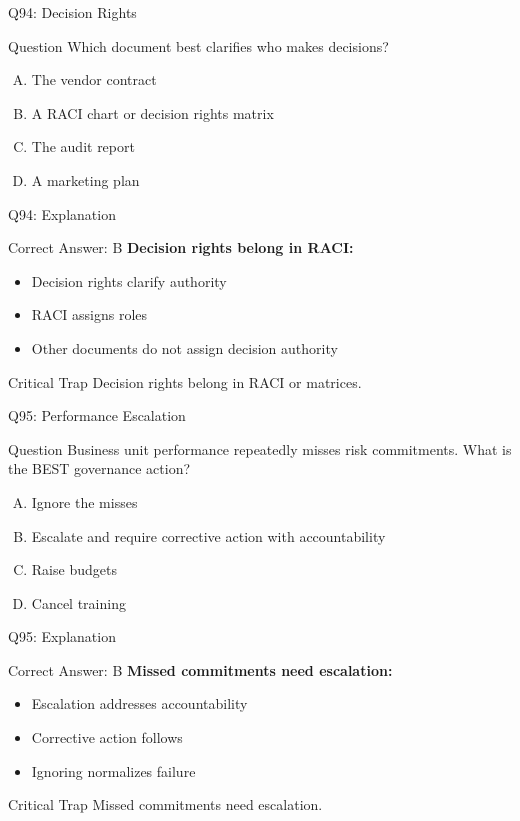 \documentclass{beamer}
\begin{document}
	\begin{frame}{Q94: Decision Rights}
		\begin{block}{Question}
			Which document best clarifies who makes decisions?
		\end{block}
		\begin{enumerate}[(A)]
			\item The vendor contract
			\item A RACI chart or decision rights matrix
			\item The audit report
			\item A marketing plan
		\end{enumerate}
	\end{frame}
	
	\begin{frame}{Q94: Explanation}
		\begin{block}{Correct Answer: B}
			\textbf{Decision rights belong in RACI:}
			\begin{itemize}
				\item Decision rights clarify authority
				\item RACI assigns roles
				\item Other documents do not assign decision authority
			\end{itemize}
		\end{block}
		\begin{alertblock}{Critical Trap}
			Decision rights belong in RACI or matrices.
		\end{alertblock}
	\end{frame}
	
	\begin{frame}{Q95: Performance Escalation}
		\begin{block}{Question}
			Business unit performance repeatedly misses risk commitments. What is the BEST governance action?
		\end{block}
		\begin{enumerate}[(A)]
			\item Ignore the misses
			\item Escalate and require corrective action with accountability
			\item Raise budgets
			\item Cancel training
		\end{enumerate}
	\end{frame}
	
	\begin{frame}{Q95: Explanation}
		\begin{block}{Correct Answer: B}
			\textbf{Missed commitments need escalation:}
			\begin{itemize}
				\item Escalation addresses accountability
				\item Corrective action follows
				\item Ignoring normalizes failure
			\end{itemize}
		\end{block}
		\begin{alertblock}{Critical Trap}
			Missed commitments need escalation.
		\end{alertblock}
	\end{frame}
	
\end{document}

